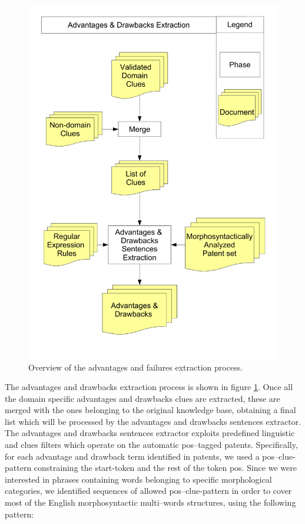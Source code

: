 \documentclass[]{book}
\theoremstyle{definition}
\theoremstyle{definition}
\theoremstyle{definition}
\theoremstyle{remark}
\begin{document}
\begin{figure}

{\centering \includegraphics[width=0.8\linewidth]{_bookdown_files/figures/relevant-sentences-extraction} 

}

\caption{Overview of the advantages and failures extraction process.}\label{fig:advantagedrawbacksextraction}
\end{figure}

The advantages and drawbacks extraction process is shown in figure
\ref{fig:advantagedrawbacksextraction}. Once all the domain specific
advantages and drawbacks clues are extracted, these are merged with the
ones belonging to the original knowledge base, obtaining a final list
which will be processed by the advantages and drawbacks sentences
extractor. The advantages and drawbacks sentences extractor exploits
predefined linguistic and clues filters which operate on the automatic
pos--tagged patents. Specifically, for each advantage and drawback term
identified in patents, we used a pos--clue-pattern constraining the
start-token and the rest of the token pos. Since we were interested in
phrases containing words belonging to specific morphological categories,
we identified sequences of allowed pos--clue-pattern in order to cover
most of the English morphosyntactic multi--words structures, using the
following pattern:
\end{document}
